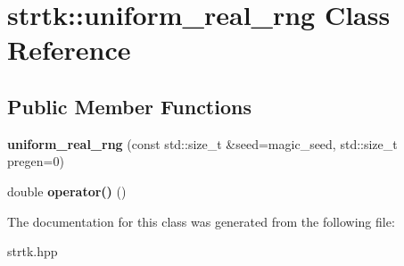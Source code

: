 \hypertarget{classstrtk_1_1uniform__real__rng}{\section{strtk\-:\-:uniform\-\_\-real\-\_\-rng Class Reference}
\label{classstrtk_1_1uniform__real__rng}
}
\subsection*{Public Member Functions}
\begin{DoxyCompactItemize}
\item 
\hypertarget{classstrtk_1_1uniform__real__rng_a55a77c09c1366c1bc094cf244b9d738e}{{\bfseries uniform\-\_\-real\-\_\-rng} (const std\-::size\-\_\-t \&seed=magic\-\_\-seed, std\-::size\-\_\-t pregen=0)}\label{classstrtk_1_1uniform__real__rng_a55a77c09c1366c1bc094cf244b9d738e}

\item 
\hypertarget{classstrtk_1_1uniform__real__rng_af9ca9314626052beb3e364dd4c3d4cde}{double {\bfseries operator()} ()}\label{classstrtk_1_1uniform__real__rng_af9ca9314626052beb3e364dd4c3d4cde}

\end{DoxyCompactItemize}


The documentation for this class was generated from the following file\-:\begin{DoxyCompactItemize}
\item 
strtk.\-hpp\end{DoxyCompactItemize}
